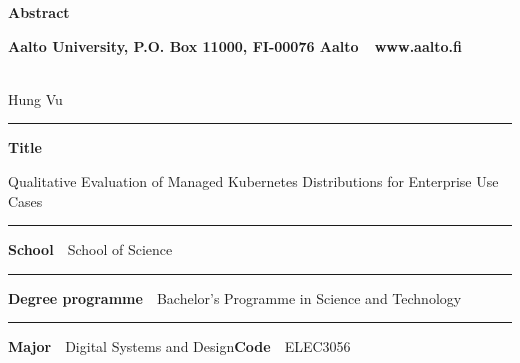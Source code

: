 
\newpage
{}
{}


\begin{spacing}{.88}

{\parindent0pt %

{\fontsize{13.9pt}{13.9pt}\selectfont
\vspace{-8.9mm}\hfill{\bfseries\sffamily\lsstyle Abstract}}

{\fontsize{9.48pt}{9.48pt}\selectfont
\vspace{.9mm}\hfill{\bfseries\sffamily\lsstyle Aalto University, P.O. Box 11000, FI-00076 Aalto~~\textcolor{aaltoGray}{www.aalto.fi}}}

\\
{\small Hung Vu}

\vspace{-2.4mm}\rule{\textwidth}{.75pt}

{\fontsize{10.5pt}{10.5pt}\bfseries\sffamily\lsstyle Title}\\
\parbox[t]{\textwidth}{\raggedright\small Qualitative Evaluation of Managed Kubernetes Distributions for Enterprise Use Cases}

\vspace{.5mm}\rule{\textwidth}{.75pt}

{\fontsize{10.5pt}{10.5pt}\bfseries\sffamily\lsstyle School}~~{\small School of Science}

\vspace{-2.4mm}\rule{\textwidth}{.75pt}

{\fontsize{10.5pt}{10.5pt}\bfseries\sffamily\lsstyle Degree programme}~~{\small Bachelor’s Programme in Science and Technology}

\vspace{-2.4mm}\rule{\textwidth}{.75pt}

{\fontsize{10.5pt}{10.5pt}\bfseries\sffamily\lsstyle Major}~~{\small Digital Systems and Design}\hfill{\fontsize{10.5pt}{10.5pt}\bfseries\sffamily\lsstyle Code}~~{\small ELEC3056}

}
\end{spacing}
